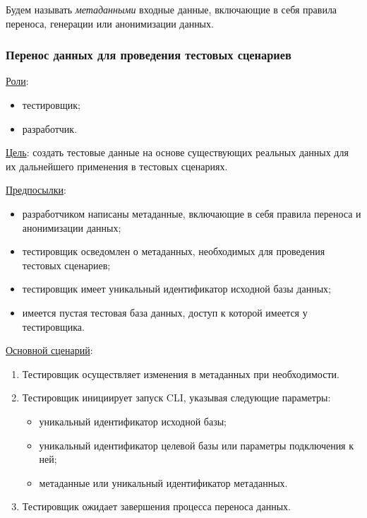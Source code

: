 Будем называть \textit{метаданными} входные данные, включающие в себя правила переноса, генерации или анонимизации данных.

\subsubsection{Перенос данных для проведения тестовых сценариев}

\underline{Роли}:

\begin{itemize}
    \item тестировщик;
    \item разработчик.
\end{itemize}

\underline{Цель}: создать тестовые данные на основе существующих реальных данных для их дальнейшего применения в тестовых сценариях.

\underline{Предпосылки}:

\begin{itemize}
    \item разработчиком написаны метаданные, включающие в себя правила переноса и анонимизации данных;
    \item тестировщик осведомлен о метаданных, необходимых для проведения тестовых сценариев;
    \item тестировщик имеет уникальный идентификатор исходной базы данных;
    \item имеется пустая тестовая база данных, доступ к которой имеется у тестировщика.
\end{itemize}

\underline{Основной сценарий}:

\begin{enumerate}
    \item Тестировщик осуществляет изменения в метаданных при необходимости.
    \item Тестировщик инициирует запуск CLI, указывая следующие параметры:
    \begin{itemize}
        \item уникальный идентификатор исходной базы;
        \item уникальный идентификатор целевой базы или параметры подключения к ней;
        \item метаданные или уникальный идентификатор метаданных.
    \end{itemize}
    \item Тестировщик ожидает завершения процесса переноса данных.
\end{enumerate}

